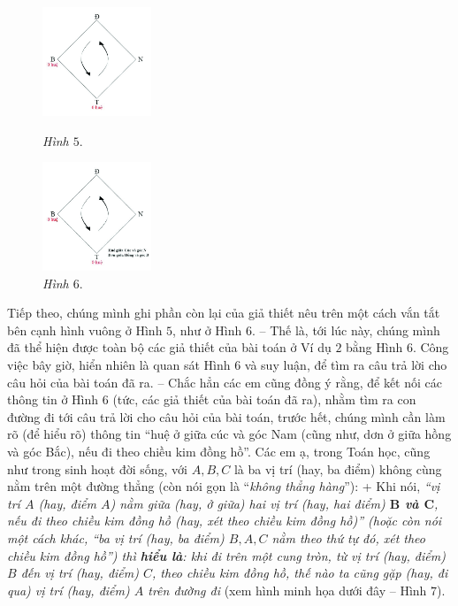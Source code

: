 	\begin{figure}
		\vspace*{-15pt}
		\centering
		\captionsetup{labelformat=empty, justification=centering}
		\hspace*{-10pt}\includegraphics[width= 0.29\textwidth]{pic5}
		\caption{\textit{\small Hình $5.$}}
		\vspace*{5pt}
		\hspace*{-10pt}\includegraphics[width=0.29\textwidth]{pic6}
		\caption{\small\textit{Hình $6.$}}
		\vspace*{-20pt}
	\end{figure}
	\vskip 0.15cm
	Tiếp theo, chúng mình ghi phần còn lại của giả thiết nêu trên một cách vắn tắt bên cạnh hình vuông ở Hình $5$, như ở Hình $6$.
	\vskip 0.15cm
	-- Thế là, tới lúc này, chúng mình đã thể hiện được toàn bộ các giả thiết của bài toán ở Ví dụ $2$ bằng Hình $6$. Công việc bây giờ, hiển nhiên là quan sát Hình $6$ và suy luận, để tìm ra câu trả lời cho câu hỏi của bài toán đã ra.
	\vskip 0.15cm
	-- Chắc hẳn các em cũng đồng ý rằng, để kết nối các thông tin ở Hình $6$ (tức, các giả thiết của bài toán đã ra), nhằm tìm ra con đường đi tới câu trả lời cho câu hỏi của bài toán, trước hết, chúng mình cần làm rõ (để hiểu rõ) thông tin “huệ ở giữa cúc và góc Nam (cũng như, dơn ở giữa hồng và góc Bắc), nếu đi theo chiều kim đồng hồ”.
	\vskip 0.15cm
	Các em ạ, trong Toán học, cũng như trong sinh hoạt đời sống, với $A, B, C$ là ba vị trí (hay, ba điểm) không cùng nằm trên một đường thẳng (còn nói gọn là “\textit{không thẳng hàng}”):
	\vskip 0.15cm
	+ Khi nói, \textit{“vị trí $A$ (\textnormal{hay}, điểm $A$) nằm giữa (\textnormal{hay}, ở giữa) hai vị trí (\textnormal{hay}, hai điểm) \textbf{\color{toancuabi}$\pmb B$ và $\pmb C$}, nếu đi theo chiều kim đồng hồ (\textnormal{hay}, xét theo chiều kim đồng hồ)” (\textnormal{hoặc còn} nói một cách khác, “ba vị trí (\textnormal{hay}, ba điểm) $B, A, C$ nằm theo thứ tự đó, xét theo chiều kim đồng hồ”) thì \textbf{\color{toancuabi}hiểu là}: khi đi trên một cung tròn, từ vị trí (\textnormal{hay}, điểm) $B$ đến vị trí (\textnormal{hay}, điểm) $C$, theo chiều kim đồng hồ, thế nào ta cũng gặp (\textnormal{hay}, đi qua) vị trí (\textnormal{hay}, điểm) $A$ trên đường đi} (xem hình minh họa dưới đây -- Hình $7$).
